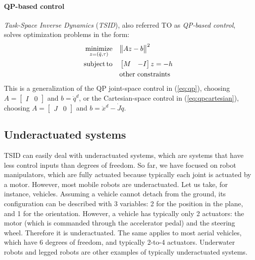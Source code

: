 	\paragraph{QP-based control}  \textit{Task-Space Inverse Dynamics} (\textit{TSID}), also referred TO as \textit{QP-based control}, solves optimization problems in the form:
	\begin{equation}
	\begin{aligned}
		\operatorname*{minimize}_{z =(\ddot q, \tau)} \quad & \big\|Az-b \big\|^2 \\
		\operatorname*{subject\,to} \quad & \begin{bmatrix}
			M & -I
		\end{bmatrix} z = -h \\ 
		& \text{other constraints}
	\end{aligned}
	\end{equation}
	This is a generalization of the QP joint-space control in (\ref{eq:qp}), choosing $A = \begin{bmatrix} I & 0 \end{bmatrix}$ and $b = \ddot q^d$, or the Cartesian-space control in (\ref{eq:qpcartesian}), choosing $A = \begin{bmatrix} J & 0 \end{bmatrix}$ and $b = \ddot x^d - \dot J \dot q$.
	
\subsection{Underactuated systems}
TSID can easily deal with underactuated systems, which are systems that have less control inputs than degrees of freedom.
So far, we have focused on robot manipulators, which are fully actuated because typically each joint is actuated by a motor.
However, most mobile robots are underactuated. 
Let us take, for instance, vehicles.
Assuming a vehicle cannot detach from the ground, its configuration can be described with 3 variables: 2 for the position in the plane, and 1 for the orientation.
However, a vehicle has typically only 2 actuators: the motor (which is commanded through the accelerator pedal) and the steering wheel.
Therefore it is underactuated.
The same applies to most aerial vehicles, which have 6 degrees of freedom, and typically 2-to-4 actuators.
Underwater robots and legged robots are other examples of typically underactuated systems.

